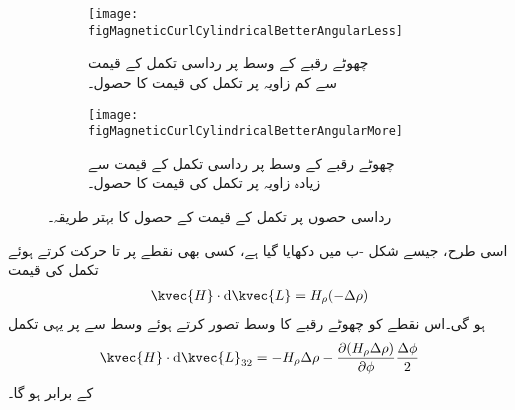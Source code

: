 \begin{figure}
\centering
\begin{subfigure}{0.5\textwidth}
\centering
\texttt{[image: figMagneticCurlCylindricalBetterAngularLess]}
\caption{چھوٹے رقبے کے وسط پر رداسی تکمل کے قیمت\\ سے کم زاویہ پر تکمل کی قیمت کا حصول۔}
\end{subfigure}
%
\begin{subfigure}{0.5\textwidth}
\centering
\texttt{[image: figMagneticCurlCylindricalBetterAngularMore]}
\caption{چھوٹے رقبے کے وسط پر رداسی تکمل کے قیمت سے \\ زیادہ زاویہ پر تکمل کی قیمت کا حصول۔}
\end{subfigure}%
\caption{رداسی حصوں پر تکمل کے قیمت کے حصول کا بہتر طریقہ۔}
\label{شکل_مقناطیسی_بہتر_گردش_نلکی_رداسی}
\end{figure}
اسی طرح، جیسے شکل -ب میں دکھایا گیا ہے، کسی بھی نقطے پر  تا  حرکت کرتے ہوئے تکمل کی قیمت
\begin{align*}
\kvec{H} \cdot \dif \kvec{L}=H_{\rho}(-\Delta \rho)
\end{align*}
ہو گی۔اس نقطے کو چھوٹے رقبے کا وسط تصور کرتے ہوئے وسط  سے  پر یہی تکمل
\begin{align}\label{مساوات_مقناطیسی_نلکی_دو_تین}
\kvec{H} \cdot \dif \kvec{L}_{32}=-H_{\rho} \Delta \rho-\frac{\partial (H_{\rho} \Delta \rho)}{\partial \phi}\frac{\Delta \phi}{2}
\end{align}
کے برابر ہو گا۔

